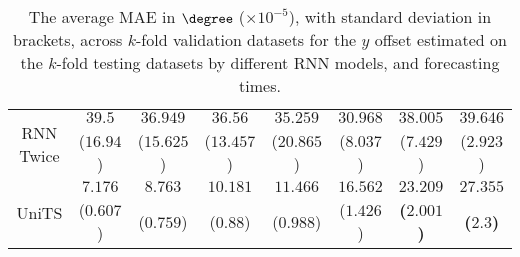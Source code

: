 \begin{table}[!ht]
{\begin{tabular}{|c|c|c|c|c|c|c|c|}
			\multirow{2}{*}{RNN Twice} & $39.5$ & $36.949$ & $36.56$ & $35.259$ & $30.968$ & $38.005$ & $39.646$ \\
			 & ($16.94$) & ($15.625$) & ($13.457$) & ($20.865$) & ($8.037$) & ($7.429$) & ($2.923$) \\ \hline
			\multirow{2}{*}{UniTS} & $7.176$ & $8.763$ & $10.181$ & $11.466$ & $16.562$ & $\mathbf{23.209}$ & $\mathbf{27.355}$ \\
			 & ($0.607$) & ($0.759$) & ($0.88$) & ($0.988$) & ($1.426$) & \textbf{(}$\mathbf{2.001}$\textbf{)} & \textbf{(}$\mathbf{2.3}$\textbf{)} \\ \hline
		\end{tabular}
	}
	\caption{The average MAE in $\degree$ ($\times 10^{-5}$), with standard deviation in brackets, across $k$-fold validation datasets for the $y$ offset estimated on the $k$-fold testing datasets by different RNN models, and forecasting times.}
	\label{tab:all_latitude_no_abs_MAE}
\end{table}

